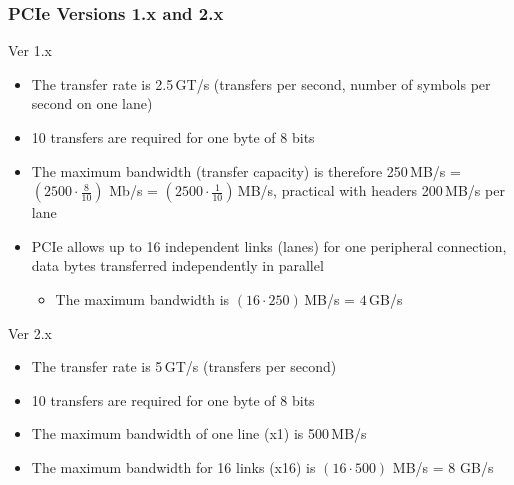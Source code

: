 \documentclass{beamer}
\begin{document}
\begin{frame}
\frametitle{PCIe Versions 1.x and 2.x}

Ver 1.x
\begin{itemize}
\item The transfer rate is 2.5\,GT/s (transfers per second, number of symbols per second on one lane)
\item 10 transfers are required for one byte of 8 bits
\item The maximum bandwidth (transfer capacity) is therefore 250\,MB/s = $(2500 \cdot \frac{8}{10})$ Mb/s = $(2500 \cdot \frac{1}{10})$\,MB/s, practical with headers 200\,MB/s per lane
\item PCIe allows up to 16 independent links (lanes) for one peripheral connection, data bytes transferred independently in parallel
\begin{itemize}
\item The maximum bandwidth is $(16 \cdot 250)$\,MB/s = $4$\,GB/s
\end{itemize}
\end{itemize}

Ver 2.x
\begin{itemize}
\item The transfer rate is 5\,GT/s (transfers per second)
\item 10 transfers are required for one byte of 8 bits
\item The maximum bandwidth of one line (x1) is 500\,MB/s
\item The maximum bandwidth for 16 links (x16) is $(16 \cdot 500)$ MB/s = $8$ GB/s
\end{itemize}
\end{frame}
\end{document}
